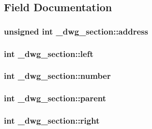 \subsection{\-Field \-Documentation}
\hypertarget{struct__dwg__section_abc0bb64cc1d17611b1604684138f005f}{
\subsubsection[{address}]{\setlength{\rightskip}{0pt plus 5cm}unsigned int {\bf \-\_\-dwg\-\_\-section\-::address}}}\label{struct__dwg__section_abc0bb64cc1d17611b1604684138f005f}
\hypertarget{struct__dwg__section_a73c62582f8439733531734a89d4afcb6}{
\subsubsection[{left}]{\setlength{\rightskip}{0pt plus 5cm}int {\bf \-\_\-dwg\-\_\-section\-::left}}}\label{struct__dwg__section_a73c62582f8439733531734a89d4afcb6}
\hypertarget{struct__dwg__section_aba43d155eaac81cf4377d8dca3fd53f7}{
\subsubsection[{number}]{\setlength{\rightskip}{0pt plus 5cm}int {\bf \-\_\-dwg\-\_\-section\-::number}}}\label{struct__dwg__section_aba43d155eaac81cf4377d8dca3fd53f7}
\hypertarget{struct__dwg__section_adcbc9ecfc4380da9935a8b9b67dc4590}{
\subsubsection[{parent}]{\setlength{\rightskip}{0pt plus 5cm}int {\bf \-\_\-dwg\-\_\-section\-::parent}}}\label{struct__dwg__section_adcbc9ecfc4380da9935a8b9b67dc4590}
\hypertarget{struct__dwg__section_af4af98e040e5d044ad94ceaf1a87ec8a}{
\subsubsection[{right}]{\setlength{\rightskip}{0pt plus 5cm}int {\bf \-\_\-dwg\-\_\-section\-::right}}}\label{struct__dwg__section_af4af98e040e5d044ad94ceaf1a87ec8a}
